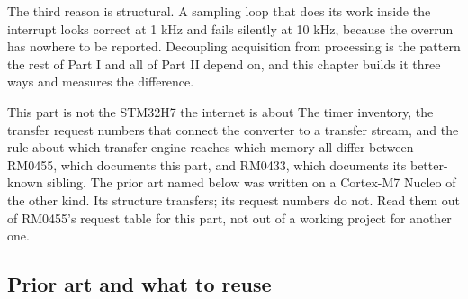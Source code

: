 The third reason is structural. A sampling loop that does its work inside the
interrupt looks correct at 1 kHz and fails silently at 10 kHz, because the
overrun has nowhere to be reported. Decoupling acquisition from processing is
the pattern the rest of Part I and all of Part II depend on, and this chapter
builds it three ways and measures the difference.

\begin{note}{This part is not the STM32H7 the internet is about}
The timer inventory, the transfer request numbers that connect the converter to
a transfer stream, and the rule about which transfer engine reaches which memory
all differ between RM0455, which documents this part, and RM0433, which
documents its better-known sibling. The prior art named below was written on a
Cortex-M7 Nucleo of the other kind. Its structure transfers; its request
numbers do not. Read them out of RM0455's request table for this part, not out
of a working project for another one.
\end{note}

\subsection*{Prior art and what to reuse}

